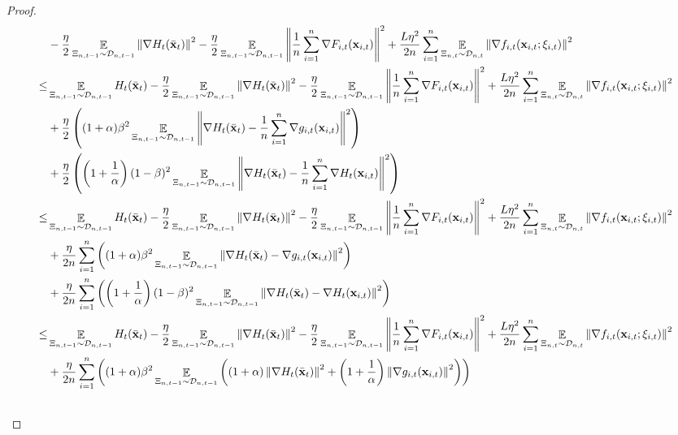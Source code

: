 \documentclass{article}
\begin{document}
\begin{proof}
\begin{align}
& - \frac{\eta}{2}\EE_{ \Xi_{n,t-1} \sim \Dcal_{n,t-1} } \lrnorm{\nabla H_t(\bar{\x}_t)}^2 - \frac{\eta}{2}\EE_{ \Xi_{n,t-1} \sim \Dcal_{n,t-1} } \lrnorm{\frac{1}{n}\sum_{i=1}^n \nabla F_{i,t}(\x_{i,t})}^2 + \frac{L\eta^2}{2n}\sum_{i=1}^n\EE_{ \Xi_{n,t} \sim \Dcal_{n,t} }\lrnorm{ \nabla f_{i,t}(\x_{i,t};\xi_{i,t})}^2 \\ \nonumber
\le & \EE_{ \Xi_{n,t-1} \sim \Dcal_{n,t-1} } H_t(\bar{\x}_t) - \frac{\eta}{2}\EE_{ \Xi_{n,t-1} \sim \Dcal_{n,t-1} }\lrnorm{\nabla H_t(\bar{\x}_t)}^2 - \frac{\eta}{2}\EE_{ \Xi_{n,t-1} \sim \Dcal_{n,t-1} }\lrnorm{\frac{1}{n}\sum_{i=1}^n \nabla F_{i,t}(\x_{i,t})}^2  + \frac{L\eta^2}{2n}\sum_{i=1}^n\EE_{ \Xi_{n,t} \sim \Dcal_{n,t} }\lrnorm{ \nabla f_{i,t}(\x_{i,t};\xi_{i,t})}^2 \\ \nonumber
& + \frac{\eta}{2}\lrincir{(1+\alpha)\beta^2\EE_{ \Xi_{n,t-1} \sim \Dcal_{n,t-1} }\lrnorm{\nabla H_t(\bar{\x}_t) -\frac{1}{n}\sum_{i=1}^n \nabla g_{i,t}(\x_{i,t})}^2 } \\ \nonumber 
& + \frac{\eta}{2}\lrincir{\lrincir{1+\frac{1}{\alpha}}(1-\beta)^2\EE_{ \Xi_{n,t-1} \sim \Dcal_{n,t-1} }\lrnorm{\nabla H_t(\bar{\x}_t) -\frac{1}{n}\sum_{i=1}^n \nabla H_t(\x_{i,t})}^2  }  \\ \nonumber
\le & \EE_{ \Xi_{n,t-1} \sim \Dcal_{n,t-1} } H_t(\bar{\x}_t) - \frac{\eta}{2}\EE_{ \Xi_{n,t-1} \sim \Dcal_{n,t-1} }\lrnorm{\nabla H_t(\bar{\x}_t)}^2 - \frac{\eta}{2}\EE_{ \Xi_{n,t-1} \sim \Dcal_{n,t-1} }\lrnorm{\frac{1}{n}\sum_{i=1}^n \nabla F_{i,t}(\x_{i,t})}^2  + \frac{L\eta^2}{2n}\sum_{i=1}^n\EE_{ \Xi_{n,t} \sim \Dcal_{n,t} }\lrnorm{ \nabla f_{i,t}(\x_{i,t};\xi_{i,t})}^2 \\ \nonumber
& + \frac{\eta}{2n}\sum_{i=1}^n\lrincir{(1+\alpha)\beta^2\EE_{ \Xi_{n,t-1} \sim \Dcal_{n,t-1} }\lrnorm{\nabla H_t(\bar{\x}_t) - \nabla g_{i,t}(\x_{i,t})}^2 } \\ \nonumber 
& + \frac{\eta}{2n}\sum_{i=1}^n\lrincir{ \lrincir{1+\frac{1}{\alpha}} (1-\beta)^2\EE_{ \Xi_{n,t-1} \sim \Dcal_{n,t-1} }\lrnorm{\nabla H_t(\bar{\x}_t) - \nabla H_t(\x_{i,t})}^2  }  \\ \nonumber
\le & \EE_{ \Xi_{n,t-1} \sim \Dcal_{n,t-1} } H_t(\bar{\x}_t) - \frac{\eta}{2}\EE_{ \Xi_{n,t-1} \sim \Dcal_{n,t-1} }\lrnorm{\nabla H_t(\bar{\x}_t)}^2 - \frac{\eta}{2}\EE_{ \Xi_{n,t-1} \sim \Dcal_{n,t-1} }\lrnorm{\frac{1}{n}\sum_{i=1}^n \nabla F_{i,t}(\x_{i,t})}^2  + \frac{L\eta^2}{2n}\sum_{i=1}^n\EE_{ \Xi_{n,t} \sim \Dcal_{n,t} }\lrnorm{ \nabla f_{i,t}(\x_{i,t};\xi_{i,t})}^2 \\ \nonumber
& + \frac{\eta}{2n}\sum_{i=1}^n\lrincir{(1+\alpha)\beta^2\EE_{ \Xi_{n,t-1} \sim \Dcal_{n,t-1} }\lrincir{ (1+\alpha)  \lrnorm{\nabla H_t(\bar{\x}_t) }^2 +  \lrincir{1+\frac{1}{\alpha}}   \lrnorm{\nabla g_{i,t}(\x_{i,t})}^2 } } \\ \nonumber 

\end{align}
\end{proof}
\end{document}
